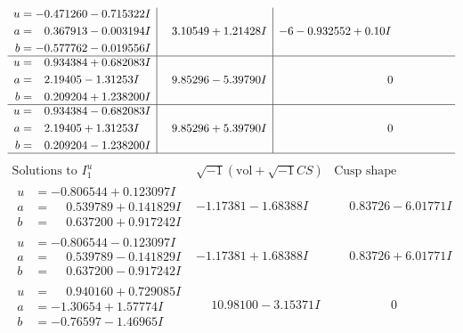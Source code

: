 \documentclass[1p]{elsarticle_modified}
\theoremstyle{definition}
\newcommand{\I}{\sqrt{-1}}
\begin{document}
$$\begin{array}{c|c|c}
\begin{aligned}
u &= -0.471260 - 0.715322 I \\
a &= \phantom{-}0.367913 - 0.003194 I \\
b &= -0.577762 - 0.019556 I\end{aligned}
 & \phantom{-}3.10549 + 1.21428 I &                  -6
-0.932552 + 0. 10   I\phantom{ +0.000000I} \\ \hline\begin{aligned}
u &= \phantom{-}0.934384 + 0.682083 I \\
a &= \phantom{-}2.19405 - 1.31253 I \\
b &= \phantom{-}0.209204 + 1.238200 I\end{aligned}
 & \phantom{-}9.85296 - 5.39790 I & \phantom{-0.000000 } 0 \\ \hline\begin{aligned}
u &= \phantom{-}0.934384 - 0.682083 I \\
a &= \phantom{-}2.19405 + 1.31253 I \\
b &= \phantom{-}0.209204 - 1.238200 I\end{aligned}
 & \phantom{-}9.85296 + 5.39790 I & \phantom{-0.000000 } 0\\
 \hline 
 \end{array}$$\newpage$$\begin{array}{c|c|c}  
\text{Solutions to }I^u_{1}& \I (\text{vol} + \sqrt{-1}CS) & \text{Cusp shape}\\
 \hline 
\begin{aligned}
u &= -0.806544 + 0.123097 I \\
a &= \phantom{-}0.539789 + 0.141829 I \\
b &= \phantom{-}0.637200 + 0.917242 I\end{aligned}
 & -1.17381 - 1.68388 I & \phantom{-}0.83726 - 6.01771 I \\ \hline\begin{aligned}
u &= -0.806544 - 0.123097 I \\
a &= \phantom{-}0.539789 - 0.141829 I \\
b &= \phantom{-}0.637200 - 0.917242 I\end{aligned}
 & -1.17381 + 1.68388 I & \phantom{-}0.83726 + 6.01771 I \\ \hline\begin{aligned}
u &= \phantom{-}0.940160 + 0.729085 I \\
a &= -1.30654 + 1.57774 I \\
b &= -0.76597 - 1.46965 I\end{aligned}
 & \phantom{-}10.98100 - 3.15371 I & \phantom{-0.000000 } 0 \\ \hline\begin{aligned}

\end{aligned}
\end{array}$$
\end{document}
